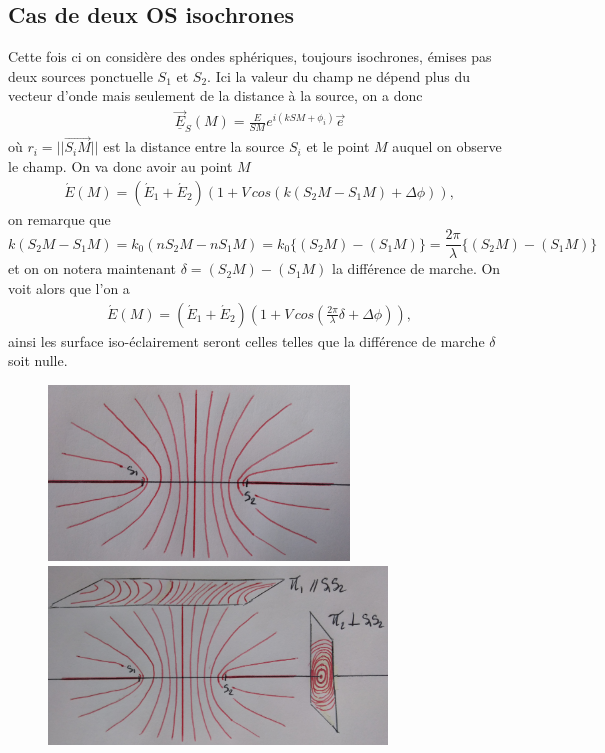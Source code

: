 \documentclass[12pt,prb,aps,epsf]{report}
\begin{document}
\subsection{Cas de deux OS isochrones}
Cette fois ci on considère des ondes sphériques, toujours isochrones, émises pas deux sources ponctuelle $S_1$ et $S_2$. Ici la valeur du champ ne dépend plus du vecteur d'onde mais seulement de la distance à la source, on a donc
\begin{eqnarray}
\underline{\vec{E}}_S(M) = \frac{E}{SM} e^{i(kSM +\phi_i)}\vec{e}
\end{eqnarray}
où $r_i = ||\vec{S_iM}||$ est la distance entre la source $S_i$ et le point $M$ auquel on observe le champ. On va donc avoir au point $M$
\begin{eqnarray}
\acute{E}(M) = (\acute{E}_1 + \acute{E}_2)\left(1+V\,cos(k(S_2M-S_1M)+\Delta\phi)\right),
\end{eqnarray}
on remarque que 
\begin{equation}
k(S_2M-S_1M)=k_0(nS_2M-nS_1M)=k_0\{(S_2M)-(S_1M)\}=\frac{2\pi}{\lambda}\{(S_2M)-(S_1M)\}
\end{equation} 
et on on notera maintenant $\delta=(S_2M)-(S_1M)$ la différence de marche. On voit alors que l'on a 
\begin{eqnarray}
\acute{E}(M) = (\acute{E}_1 + \acute{E}_2)\left(1+V\,cos\left(\frac{2\pi}{\lambda}\delta+\Delta\phi\right)\right),
\end{eqnarray}
ainsi les surface iso-éclairement seront celles telles que la différence de marche $\delta$ soit nulle.\\

\begin{figure}[h]
	\centerline{ \includegraphics[width=8cm]{2OS}
				 \includegraphics[width=9cm]{2OSP}}
\end{figure}
\end{document}

